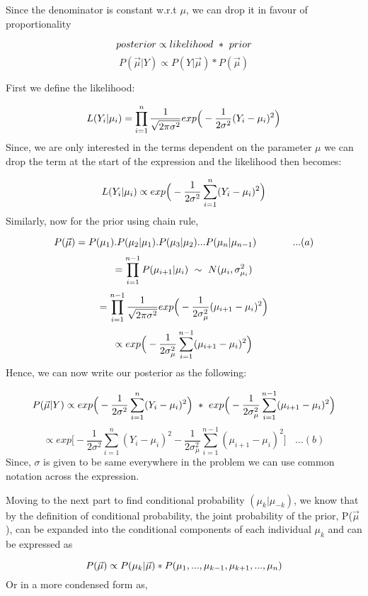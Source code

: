 \documentclass[
]{article}
\begin{document}
Since the denominator is constant w.r.t \(\mu\), we can drop it in
favour of proportionality

\[
posterior \propto likelihood \ * \ prior \\
\] \[
P(\vec{\mu}|Y) \propto P(Y|\vec{\mu}) * P(\vec{\mu})
\]

First we define the likelihood:

\[
L(Y_i|\mu_i) = \prod_{i=1}^n\frac{1}{\sqrt{2\pi\sigma^2}}exp\Big(-\frac{1}{2\sigma^2}(Y_i-\mu_i)^2\Big) \\
\] Since, we are only interested in the terms dependent on the parameter
\(\mu\) we can drop the term at the start of the expression and the
likelihood then becomes:

\[
L(Y_i|\mu_i) \propto exp\Big(-\frac{1}{2\sigma^2}\sum_{i=1}^n(Y_i-\mu_i)^2\Big) \\
\] Similarly, now for the prior using chain rule,

\[
P(\vec{\mu}) = P(\mu_1).P(\mu_2|\mu_1).P(\mu_3|\mu_2)...P(\mu_n|\mu_{n-1}) \ \ \ \ \ \ \ \ \ \ \ ...(a) \\
\] \[
 = \prod_{i=1}^{n-1}P(\mu_{i+1}|\mu_i) \ \sim \ N(\mu_i,\sigma_{\mu_i}^2) \\
\] \[
 = \prod_{i=1}^{n-1}\frac{1}{\sqrt{2\pi\sigma^2}}exp\Big(-\frac{1}{2\sigma_\mu^2}(\mu_{i+1}-\mu_i)^2\Big) \\
\] \[
 \propto exp\Big(-\frac{1}{2\sigma_\mu^2}\sum_{i=1}^{n-1}(\mu_{i+1}-\mu_i)^2\Big) \\
\] Hence, we can now write our posterior as the following:

\[
P(\vec{\mu}|Y) \propto exp\Big(-\frac{1}{2\sigma^2}\sum_{i=1}^n(Y_i-\mu_i)^2\Big)\ * \  exp\Big(-\frac{1}{2\sigma_\mu^2}\sum_{i=1}^{n-1}(\mu_{i+1}-\mu_i)^2\Big) \\
\] \[
\propto exp\Big[ -\frac{1}{2\sigma^2}\sum_{i=1}^n(Y_i-\mu_i)^2 - \frac{1}{2\sigma_\mu^2}\sum_{i=1}^{n-1}(\mu_{i+1}-\mu_i)^2  \Big] \ \ \ \ ...(b)
\] Since, \(\sigma\) is given to be same everywhere in the problem we
can use common notation across the expression.

Moving to the next part to find conditional probability
\((\mu_k|\mu_{-k})\), we know that by the definition of conditional
probability, the joint probability of the prior, P(\(\vec\mu\)), can be
expanded into the conditional components of each individual \(\mu_k\)
and can be expressed as

\[
P(\vec{\mu}) \propto P(\mu_k | \vec\mu) * P(\mu_1,...,\mu_{k-1},\mu_{k+1},...,\mu_n) \\
\] Or in a more condensed form as,
\end{document}
